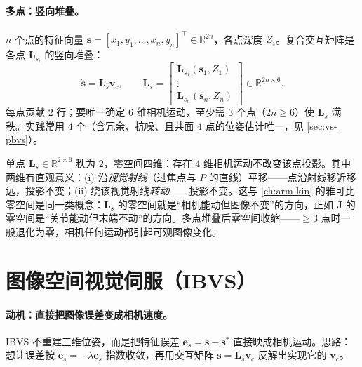 \paragraph{多点：竖向堆叠。}
$n$ 个点的特征向量 $\mathbf{s}=[x_1,y_1,\dots,x_n,y_n]^\top\in\mathbb{R}^{2n}$，各点深度 $Z_i$。复合交互矩阵是各点 $\mathbf{L}_{s_i}$ 的竖向堆叠\cite{siciliano2009robotics,spong2006robot}：
\begin{equation}
  \dot{\mathbf{s}}=\mathbf{L}_s\mathbf{v}_c,\qquad
  \mathbf{L}_s=\begin{bmatrix}\mathbf{L}_{s_1}(\mathbf{s}_1,Z_1)\\\vdots\\\mathbf{L}_{s_n}(\mathbf{s}_n,Z_n)\end{bmatrix}\in\mathbb{R}^{2n\times6}.
  \label{eq:vs-Ls-stack}
\end{equation}
每点贡献 $2$ 行；要唯一确定 $6$ 维相机运动，至少需 $3$ 个点（$2n\ge6$）使 $\mathbf{L}_s$ 满秩。实践常用 $4$ 个（含冗余、抗噪、且共面 $4$ 点的位姿估计唯一，见 \cref{sec:vs-pbvs}）。

\begin{insight}\label{insight:vs-nullspace}
单点 $\mathbf{L}_s\in\mathbb{R}^{2\times6}$ 秩为 $2$，零空间四维：存在 $4$ 维相机运动不改变该点投影\cite{spong2006robot,siciliano2009robotics}。其中两维有直观意义：(i) 沿\emph{视觉射线}（过焦点与 $P$ 的直线）平移——点沿射线移近移远，投影不变；(ii) 绕该视觉射线\emph{转动}——投影不变。这与 \cref{ch:arm-kin} 的雅可比零空间是同一类概念：$\mathbf{L}_s$ 的零空间就是“相机能动但图像不变”的方向，正如 $\mathbf{J}$ 的零空间是“关节能动但末端不动”的方向。多点堆叠后零空间收缩——$\ge3$ 点时一般退化为零，相机任何运动都引起可观图像变化。
\end{insight}

\section{图像空间视觉伺服（IBVS）}
\label{sec:vs-ibvs}

\paragraph{动机：直接把图像误差变成相机速度。}
IBVS 不重建三维位姿，而是把特征误差 $\mathbf{e}_s=\mathbf{s}-\mathbf{s}^\ast$ 直接映成相机运动。思路：想让误差按 $\dot{\mathbf{e}}_s=-\lambda\mathbf{e}_s$ 指数收敛，再用交互矩阵 $\dot{\mathbf{s}}=\mathbf{L}_s\mathbf{v}_c$ 反解出实现它的 $\mathbf{v}_c$。

